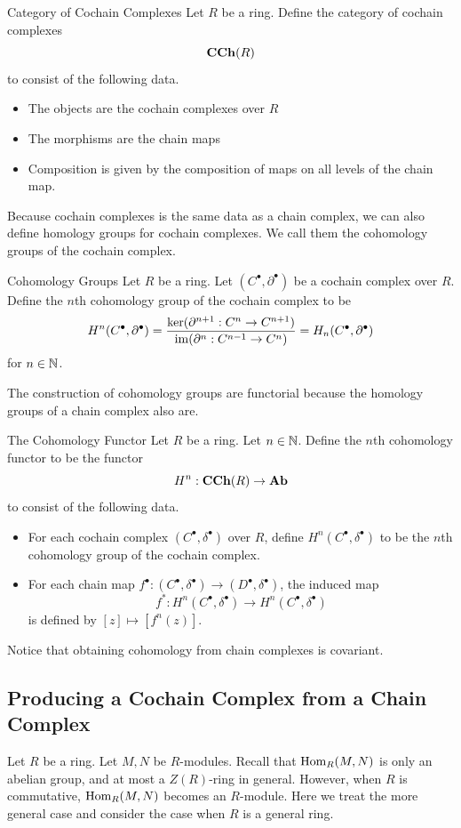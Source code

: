 \documentclass[a4paper]{article}
\begin{document}
\begin{defn}{Category of Cochain Complexes}{} Let $R$ be a ring. Define the category of cochain complexes $$\bold{CCh}(R)$$ to consist of the following data. 
\begin{itemize}
\item The objects are the cochain complexes over $R$
\item The morphisms are the chain maps
\item Composition is given by the composition of maps on all levels of the chain map. 
\end{itemize}
\end{defn}

Because cochain complexes is the same data as a chain complex, we can also define homology groups for cochain complexes. We call them the cohomology groups of the cochain complex. 

\begin{defn}{Cohomology Groups}{} Let $R$ be a ring. Let $(C^\bullet,\partial^\bullet)$ be a cochain complex over $R$. Define the $n$th cohomology group of the cochain complex to be $$H^n(C^\bullet,\partial^\bullet)=\frac{\ker(\partial^{n+1}:C^n\to C^{n+1})}{\operatorname{im}(\partial^n:C^{n-1}\to C^n)}=H_n(C^\bullet,\partial^\bullet)$$ for $n\in\mathbb{N}$. 
\end{defn}

The construction of cohomology groups are functorial because the homology groups of a chain complex also are. 

\begin{defn}{The Cohomology Functor}{} Let $R$ be a ring. Let $n\in\mathbb{N}$. Define the $n$th cohomology functor to be the functor $$H^n:\bold{CCh}(R)\to\bold{Ab}$$ to consist of the following data. 
\begin{itemize}
\item For each cochain complex $(C^\bullet,\delta^\bullet)$ over $R$, define $H^n(C^\bullet,\delta^\bullet)$ to be the $n$th cohomology group of the cochain complex. 
\item For each chain map $f^\bullet:(C^\bullet,\delta^\bullet)\to(D^\bullet,\delta^\bullet)$, the induced map $$f^\ast:H^n(C^\bullet,\delta^\bullet)\to H^n(C^\bullet,\delta^\bullet)$$ is defined by $[z]\mapsto[f^n(z)]$. 
\end{itemize}
\end{defn}

Notice that obtaining cohomology from chain complexes is covariant. 

\subsection{Producing a Cochain Complex from a Chain Complex}
Let $R$ be a ring. Let $M,N$ be $R$-modules. Recall that $\operatorname{Hom}_R(M,N)$ is only an abelian group, and at most a $Z(R)$-ring in general. However, when $R$ is commutative, $\operatorname{Hom}_R(M,N)$ becomes an $R$-module. Here we treat the more general case and consider the case when $R$ is a general ring. 
\end{document}
